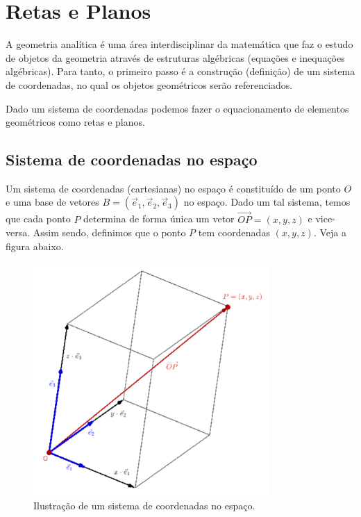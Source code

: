 

\chapter{Retas e Planos}\label{cap_estudo}
\badgeRevisar

A geometria analítica é uma área interdisciplinar da matemática que faz o estudo de objetos da geometria através de estruturas algébricas (equações e inequações algébricas). Para tanto, o primeiro passo é a construção (definição) de um sistema de coordenadas, no qual os objetos geométricos serão referenciados.

Dado um sistema de coordenadas podemos fazer o equacionamento de elementos geométricos como retas e planos.

\section{Sistema de coordenadas no espaço}\label{cap_estudo_sec_scoord}
\badgeRevisar


Um sistema de coordenadas (cartesianas\descartes) no espaço é constituído de um ponto $O$ e uma base de vetores $B = (\vec{e}_1, \vec{e}_2, \vec{e}_3)$ no espaço. Dado um tal sistema, temos que cada ponto $P$ determina de forma única um vetor $\overrightarrow{OP} = (x,y,z)$ e vice-versa. Assim sendo, definimos que o ponto $P$ tem coordenadas $(x,y,z)$. Veja a figura abaixo.

\begin{figure}[H]
  \centering
  \includegraphics[width=0.8\textwidth]{cap_estudo/dados/fig_scoord/fig}
  \caption{Ilustração de um sistema de coordenadas no espaço.}
  \label{fig:scoord}
\end{figure}

